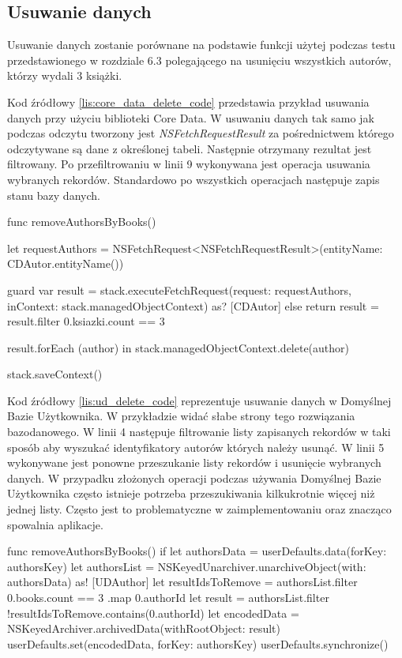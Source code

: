 \subsection{Usuwanie danych}

Usuwanie danych zostanie porównane na podstawie funkcji użytej podczas testu przedstawionego w rozdziale 6.3 polegającego na usunięciu wszystkich autorów, którzy wydali 3 książki.

 Kod źródłowy \ref{lis:core_data_delete_code} przedstawia przykład usuwania danych przy użyciu biblioteki Core Data. W usuwaniu danych tak samo jak podczas odczytu tworzony jest \textit{NSFetchRequestResult} za pośrednictwem którego odczytywane są dane z określonej tabeli. Następnie otrzymany rezultat jest filtrowany. Po przefiltrowaniu w linii 9 wykonywana jest operacja usuwania wybranych rekordów. Standardowo po wszystkich operacjach następuje zapis stanu bazy danych.
 
\begin{code}[
		language=swift,
		caption={Przykład usuwania danych Core Data},
		label={lis:core_data_delete_code},
	]
    func removeAuthorsByBooks() {
        let requestAuthors = NSFetchRequest<NSFetchRequestResult>(entityName: CDAutor.entityName())
        
        guard var result = stack.executeFetchRequest(request: requestAuthors, inContext: stack.managedObjectContext) as? [CDAutor] else { return }
        result = result.filter { 0.ksiazki.count == 3 }
        
        result.forEach { (author) in
            stack.managedObjectContext.delete(author)
        }
        
        stack.saveContext()
    }
 \end{code}
    
Kod źródłowy \ref{lis:ud_delete_code} reprezentuje usuwanie danych w Domyślnej Bazie Użytkownika. W przykładzie widać słabe strony tego rozwiązania bazodanowego. W linii 4 następuje filtrowanie listy zapisanych rekordów w taki sposób aby wyszukać identyfikatory autorów których należy usunąć. W linii 5 wykonywane jest ponowne przeszukanie listy rekordów i usunięcie wybranych danych. W przypadku złożonych operacji podczas używania Domyślnej Bazie Użytkownika często istnieje potrzeba przeszukiwania kilkukrotnie więcej niż jednej listy. Często jest to problematyczne w zaimplementowaniu oraz znacząco spowalnia aplikacje.
    
\begin{code}[
		language=swift,
		caption={Przykład usuwania danych User Defaults},
		label={lis:ud_delete_code},
	]
        func removeAuthorsByBooks() {
        if  let authorsData = userDefaults.data(forKey: authorsKey) {
            let authorsList = NSKeyedUnarchiver.unarchiveObject(with: authorsData) as! [UDAuthor]
            let resultIdsToRemove = authorsList.filter { 0.books.count == 3 }.map { 0.authorId }
            let result = authorsList.filter { !resultIdsToRemove.contains(0.authorId) }
            let encodedData = NSKeyedArchiver.archivedData(withRootObject: result)
            userDefaults.set(encodedData, forKey: authorsKey)
            userDefaults.synchronize()
        }
    }
\end{code}

